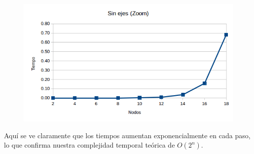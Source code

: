 \begin{figure}[h!]
   \begin{center}
 	\includegraphics[scale=0.7]{imagenes/exacto/Vacio(zoom).png}
   \end{center}
 \end{figure}
\newpage

Aqu\'i se ve claramente que los tiempos aumentan exponencialmente en cada paso, lo que confirma nuestra complejidad temporal te\'orica de $O(2^n)$.\\

